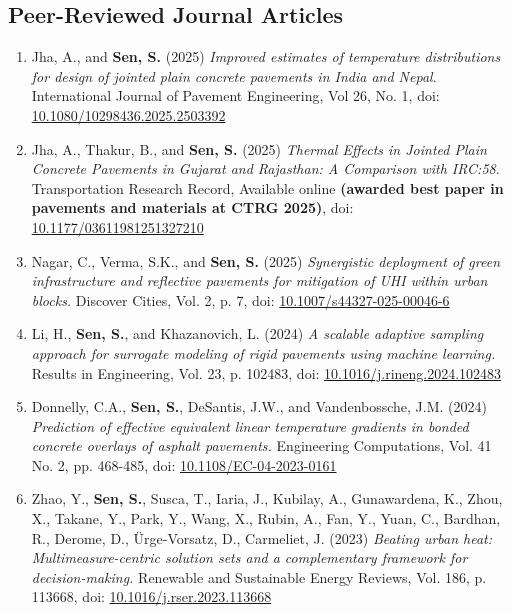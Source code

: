 \documentclass[12pt]{article}
\begin{document}
\subsection*{Peer-Reviewed Journal Articles}
\begin{enumerate}
	\item Jha, A., and \textbf{Sen, S.} (2025) \textit{Improved estimates of temperature distributions for design of jointed plain concrete pavements in India and Nepal}. International Journal of Pavement Engineering, Vol 26, No. 1, doi: \href{https://doi.org/10.1080/10298436.2025.2503392}{10.1080/10298436.2025.2503392}
	\item Jha, A., Thakur, B., and \textbf{Sen, S.} (2025) \textit{Thermal Effects in Jointed Plain Concrete Pavements in Gujarat and Rajasthan: A Comparison with IRC:58}. Transportation Research Record, Available online \textbf{(awarded best paper in pavements and materials at CTRG 2025)}, doi: \href{https://doi.org/10.1177/03611981251327210}{10.1177/03611981251327210}
	\item Nagar, C., Verma, S.K., and \textbf{Sen, S.} (2025) \textit{Synergistic deployment of green infrastructure and reflective pavements for mitigation of UHI within urban blocks.} Discover Cities, Vol. 2, p. 7, doi: \href{https://doi.org/10.1007/s44327-025-00046-6}{10.1007/s44327-025-00046-6}
	\item Li, H., \textbf{Sen, S.}, and Khazanovich, L. (2024) \textit{A scalable adaptive sampling approach for surrogate modeling of rigid pavements using machine learning.} Results in Engineering, Vol. 23, p. 102483, doi: \href{https://doi.org/10.1016/j.rineng.2024.102483}{10.1016/j.rineng.2024.102483}
	\item Donnelly, C.A., \textbf{Sen, S.}, DeSantis, J.W., and Vandenbossche, J.M. (2024) \textit{Prediction of effective equivalent linear temperature gradients in bonded concrete overlays of asphalt pavements.}  Engineering Computations, Vol. 41 No. 2, pp. 468-485, doi: \href{https://doi.org/10.1108/EC-04-2023-0161}{10.1108/EC-04-2023-0161}
	\item Zhao, Y., \textbf{Sen, S.}, Susca, T., Iaria, J., Kubilay, A., Gunawardena, K., Zhou, X., Takane, Y., Park, Y., Wang, X., Rubin, A., Fan, Y., Yuan, C., Bardhan, R., Derome, D., Ürge-Vorsatz, D., Carmeliet, J. (2023) \textit{Beating urban heat: Multimeasure-centric solution sets and a complementary framework for decision-making.} Renewable and Sustainable Energy Reviews, Vol. 186, p. 113668, doi: \href{https://doi.org/10.1016/j.rser.2023.113668}{10.1016/j.rser.2023.113668}

\end{enumerate}
\end{document}
